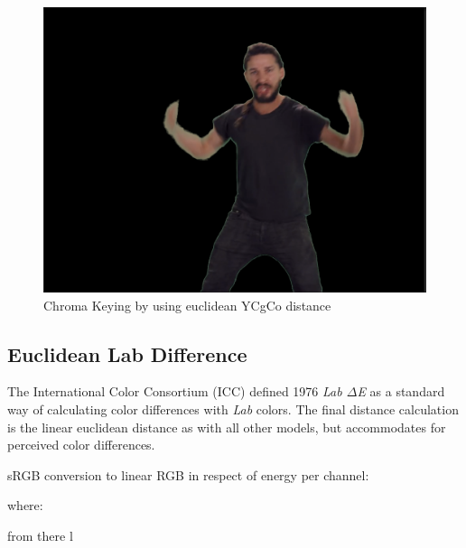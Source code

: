 \begin{figure}[htb]
	\includegraphics[width=\textwidth]{_raw_resources/Comparison_YCgCo_color.png}
	\caption{Chroma Keying by using euclidean YCgCo distance}
	\label{fig:chroma:euclidean:ycgco}
\end{figure}

\subsection{Euclidean Lab Difference}
The International Color Consortium (ICC) defined 1976 \textit{Lab $\Delta$E} as 
a standard way of calculating color differences with \textit{Lab} colors. The 
final distance calculation is the linear euclidean distance as with all other 
models, but accommodates for perceived color differences.


sRGB conversion to linear RGB in respect of energy per channel:


where: 


from there l

